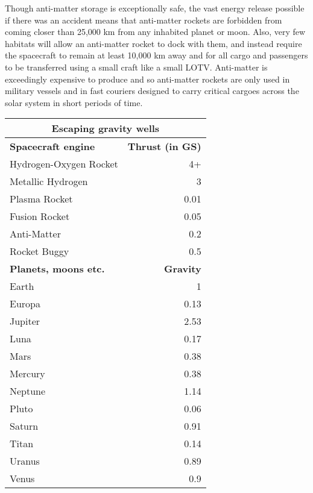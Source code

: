 Though anti-matter storage is exceptionally safe, the vast energy release possible if there was an accident means that anti-matter rockets are forbidden from coming closer than 25,000 km from any inhabited planet or moon. Also, very few habitats will allow an anti-matter rocket to dock with them, and instead require the spacecraft to remain at least 10,000 km away and for all cargo and passengers to be transferred using a small craft like a small LOTV. Anti-matter is exceedingly expensive to produce and so anti-matter rockets are only used in military vessels and in fast couriers designed to carry critical cargoes across the solar system in short periods of time. 

\begin{table} \begin{tabular}{|l|r} \hline

\multicolumn{2}{|c|}{\textbf{Escaping gravity wells}} \\ \hline

\textbf{Spacecraft engine}	&\textbf{Thrust (in GS)} \\ \hline

Hydrogen-Oxygen Rocket	&4+ \\ \hline

Metallic Hydrogen	&3 \\ \hline

Plasma Rocket	&0.01 \\ \hline

Fusion Rocket	&0.05 \\ \hline

Anti-Matter	&0.2 \\ \hline

Rocket Buggy	&0.5 \\ \hline

\textbf{Planets, moons etc.}	&\textbf{Gravity} \\ \hline

Earth	&1 \\ \hline

Europa	&0.13 \\ \hline

Jupiter	&2.53 \\ \hline

Luna	&0.17 \\ \hline

Mars	&0.38 \\ \hline

Mercury	&0.38 \\ \hline

Neptune	&1.14 \\ \hline

Pluto	&0.06 \\ \hline

Saturn	&0.91 \\ \hline

Titan	&0.14 \\ \hline

Uranus	&0.89 \\ \hline

Venus	&0.9 \\ \hline

\end{tabular} \label{tab:excaping-gravity} \end{table} 

